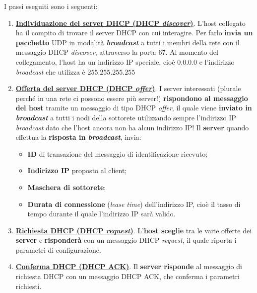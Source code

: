 \documentclass[a4paper]{article}
\begin{document}
	\noindent
	I passi eseguiti sono i seguenti:
	\begin{enumerate}
		\item \underline{\textbf{Individuazione del server DHCP (\textcolor{Red3}{DHCP \emph{discover}})}}. L’host collegato ha il compito di trovare il server \textsf{DHCP} con cui interagire. Per farlo \textbf{invia un pacchetto} \textsf{UDP} in modalità \textbf{\emph{broadcast}} a tutti i membri della rete con il messaggio \textsf{DHCP} \emph{discover}, attraverso la porta $67$. Al momento del collegamento, l’host ha un indirizzo IP speciale, cioè $0.0.0.0$ e l’indirizzo \emph{broadcast} che utilizza è $255.255.255.255$
		
		\item \underline{\textbf{Offerta del server DHCP (\textcolor{Red3}{DHCP \emph{offer}})}}. I server interessati (plurale perché in una rete ci possono essere più server!) \textbf{rispondono al messaggio del host} tramite un messaggio di tipo \textsf{DHCP} \emph{offer}, il quale viene \textbf{inviato in \emph{broadcast}} a tutti i nodi della sottorete utilizzando sempre l’indirizzo IP \emph{broadcast} dato che l’host ancora non ha alcun indirizzo IP!\newline
		Il \textbf{server} quando effettua la \textbf{risposta in \emph{broadcast}}, invia:
		\begin{itemize}[label=-]
			\item \textbf{ID} di transazione del messaggio di identificazione ricevuto;
			\item \textbf{Indirizzo IP} proposto al client;
			\item \textbf{Maschera di sottorete};
			\item \textbf{Durata di connessione} (\emph{lease time}) dell'indirizzo IP, cioè il tasso di tempo durante il quale l'indirizzo IP sarà valido.
		\end{itemize}
		
		\item \underline{\textbf{Richiesta DHCP (\textcolor{Red3}{DHCP \emph{request}})}}. L’\textbf{host sceglie} tra le varie offerte dei \textbf{server} e \textbf{risponderà} con un messaggio \textsf{DHCP} \emph{request}, il quale riporta i parametri di configurazione.
		
		\item \underline{\textbf{Conferma DHCP (\textcolor{Red3}{DHCP ACK})}}. Il \textbf{server risponde} al messaggio di richiesta \textsf{DHCP} con un messaggio \textsf{DHCP ACK}, che conferma i parametri richiesti.
	\end{enumerate}
\end{document}
